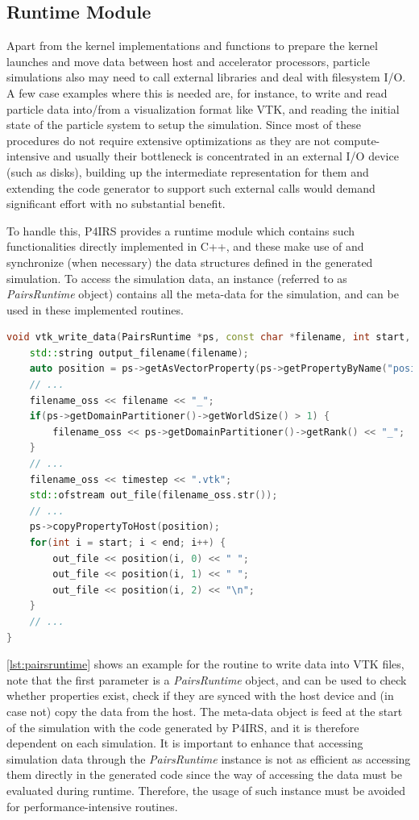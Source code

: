 \documentclass[preprint,12pt]{elsarticle}
\begin{document}
\subsection{Runtime Module}

Apart from the kernel implementations and functions to prepare the kernel launches and move data between host and accelerator processors, particle simulations also may need to call external libraries and deal with filesystem I/O.
A few case examples where this is needed are, for instance, to write and read particle data into/from a visualization format like VTK, and reading the initial state of the particle system to setup the simulation.
Since most of these procedures do not require extensive optimizations as they are not compute-intensive and usually their bottleneck is concentrated in an external I/O device (such as disks), building up the intermediate representation for them and extending the code generator to support such external calls would demand significant effort with no substantial benefit.

To handle this, P4IRS provides a runtime module which contains such functionalities directly implemented in C++, and these make use of and synchronize (when necessary) the data structures defined in the generated simulation.
To access the simulation data, an instance (referred to as \emph{PairsRuntime} object) contains all the meta-data for the simulation, and can be used in these implemented routines.

\begin{lstlisting}[language=C++,
		   label={lst:pairsruntime},
	   	   caption={P4IRS runtime routine example for writing VTK data into a file.}]
void vtk_write_data(PairsRuntime *ps, const char *filename, int start, int end, int timestep) {
    std::string output_filename(filename);
    auto position = ps->getAsVectorProperty(ps->getPropertyByName("position"));
    // ...
    filename_oss << filename << "_";
    if(ps->getDomainPartitioner()->getWorldSize() > 1) {
        filename_oss << ps->getDomainPartitioner()->getRank() << "_";
    }
    // ...
    filename_oss << timestep << ".vtk";
    std::ofstream out_file(filename_oss.str());
    // ...
    ps->copyPropertyToHost(position);
    for(int i = start; i < end; i++) {
        out_file << position(i, 0) << " ";
        out_file << position(i, 1) << " ";
        out_file << position(i, 2) << "\n";
    }
    // ...
}
\end{lstlisting}

\autoref{lst:pairsruntime} shows an example for the routine to write data into VTK files, note that the first parameter is a \emph{PairsRuntime} object, and can be used to check whether properties exist, check if they are synced with the host device and (in case not) copy the data from the host.
The meta-data object is feed at the start of the simulation with the code generated by P4IRS, and it is therefore dependent on each simulation.
It is important to enhance that accessing simulation data through the \emph{PairsRuntime} instance is not as efficient as accessing them directly in the generated code since the way of accessing the data must be evaluated during runtime.
Therefore, the usage of such instance must be avoided for performance-intensive routines.
\end{document}
